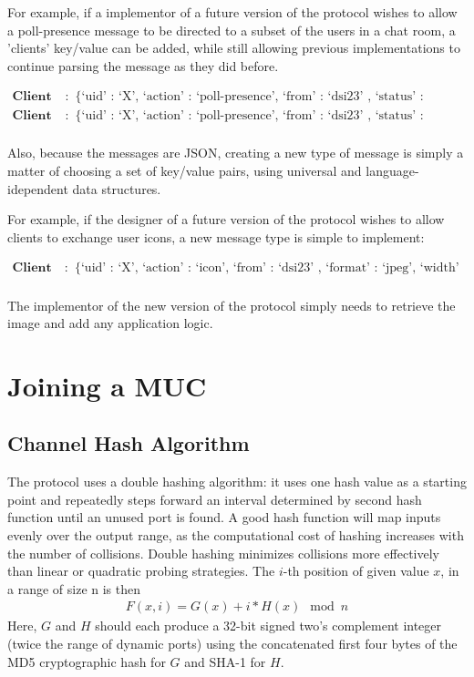\documentclass{article}
\begin{document}
For example, if a implementor of a future version of the protocol wishes to allow
a poll-presence message to be directed to a subset of the users in a chat room, a
'clients' key/value can be added, while still allowing previous implementations to
continue parsing the message as they did before.

\begin{align*}
\textbf{Client A}:& \text{\{ `uid' : `X', `action' : `poll-presence', `from' :
`dsi23' , `status' : `online' \}} \\
\textbf{Client A}:& \text{\{ `uid' : `X', `action' : `poll-presence', `from' :
`dsi23' , `status' : `online', `clients' : ['bb482','cek47'] \}} \\
\end{align*}

Also, because the messages are JSON, creating a new type of message is simply
a matter of choosing a set of key/value pairs, using universal and language-idependent
data structures.

For example, if the designer of a future version of the protocol wishes to allow clients
to exchange user icons, a new message type is simple to implement:

\begin{align*}
\textbf{Client A}:& \text{\{ `uid' : `X', `action' : `icon', `from' :
`dsi23' , `format' : `jpeg', `width' : `50px', `height' : `50px', `image' : `...' \}} \\
\end{align*}

The implementor of the new version of the protocol simply needs to 
retrieve the image and add any application logic.

\section{Joining a MUC}

\subsection{Channel Hash Algorithm}

The protocol uses a double hashing algorithm: it uses one hash value as a
starting point and repeatedly steps forward an interval determined by second
hash function until an unused port is found. A good hash function will map
inputs evenly over the output range, as the computational cost of hashing
increases with the number of collisions. Double hashing minimizes collisions
more effectively than linear or quadratic probing strategies. The $i$-th position
of given value $x$, in a range of size n is then 
\begin{align*}
F(x,i) = G(x) + i * H(x)\mod{n}
\end{align*}
Here, $G$
and $H$ should each produce a 32-bit signed two's complement integer (twice the
range of dynamic ports) using the concatenated first four bytes of the MD5
cryptographic hash for $G$ and SHA-1 for $H$.
\end{document}
